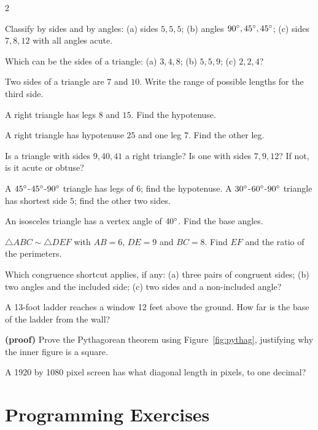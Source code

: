 \begin{multicols}{2}
\begin{exercises}
\item Classify by sides and by angles: (a) sides $5, 5, 5$; (b) angles $90^\circ, 45^\circ, 45^\circ$; (c) sides $7, 8, 12$ with all angles acute.
\item Which can be the sides of a triangle: (a) $3, 4, 8$; (b) $5, 5, 9$; (c) $2, 2, 4$?
\item Two sides of a triangle are $7$ and $10$. Write the range of possible lengths for the third side.
\item A right triangle has legs $8$ and $15$. Find the hypotenuse.
\item A right triangle has hypotenuse $25$ and one leg $7$. Find the other leg.
\item Is a triangle with sides $9, 40, 41$ a right triangle? Is one with sides $7, 9, 12$? If not, is it acute or obtuse?
\item A $45^\circ$-$45^\circ$-$90^\circ$ triangle has legs of $6$; find the hypotenuse. A $30^\circ$-$60^\circ$-$90^\circ$ triangle has shortest side $5$; find the other two sides.
\item An isosceles triangle has a vertex angle of $40^\circ$. Find the base angles.
\item $\triangle ABC \sim \triangle DEF$ with $AB = 6$, $DE = 9$ and $BC = 8$. Find $EF$ and the ratio of the perimeters.
\item Which congruence shortcut applies, if any: (a) three pairs of congruent sides; (b) two angles and the included side; (c) two sides and a non-included angle?
\item A 13-foot ladder reaches a window 12 feet above the ground. How far is the base of the ladder from the wall?
\item \textbf{(proof)} Prove the Pythagorean theorem using Figure~\ref{fig:pythag}, justifying why the inner figure is a square.
\item A 1920 by 1080 pixel screen has what diagonal length in pixels, to one decimal?
\end{exercises}
\end{multicols}

\section{Programming Exercises}

